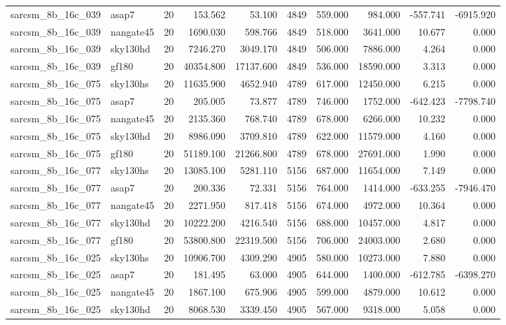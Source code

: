 \begin{tabular}{llrrrrrrrr}
sarcsm\_8b\_16c\_039 & asap7 & 20 & 153.562 & 53.100 & 4849 & 559.000 & 984.000 & -557.741 & -6915.920 \\
sarcsm\_8b\_16c\_039 & nangate45 & 20 & 1690.030 & 598.766 & 4849 & 518.000 & 3641.000 & 10.677 & 0.000 \\
sarcsm\_8b\_16c\_039 & sky130hd & 20 & 7246.270 & 3049.170 & 4849 & 506.000 & 7886.000 & 4.264 & 0.000 \\
sarcsm\_8b\_16c\_039 & gf180 & 20 & 40354.800 & 17137.600 & 4849 & 536.000 & 18590.000 & 3.313 & 0.000 \\
sarcsm\_8b\_16c\_075 & sky130hs & 20 & 11635.900 & 4652.940 & 4789 & 617.000 & 12450.000 & 6.215 & 0.000 \\
sarcsm\_8b\_16c\_075 & asap7 & 20 & 205.005 & 73.877 & 4789 & 746.000 & 1752.000 & -642.423 & -7798.740 \\
sarcsm\_8b\_16c\_075 & nangate45 & 20 & 2135.360 & 768.740 & 4789 & 678.000 & 6266.000 & 10.232 & 0.000 \\
sarcsm\_8b\_16c\_075 & sky130hd & 20 & 8986.090 & 3709.810 & 4789 & 622.000 & 11579.000 & 4.160 & 0.000 \\
sarcsm\_8b\_16c\_075 & gf180 & 20 & 51189.100 & 21266.800 & 4789 & 678.000 & 27691.000 & 1.990 & 0.000 \\
sarcsm\_8b\_16c\_077 & sky130hs & 20 & 13085.100 & 5281.110 & 5156 & 687.000 & 11654.000 & 7.149 & 0.000 \\
sarcsm\_8b\_16c\_077 & asap7 & 20 & 200.336 & 72.331 & 5156 & 764.000 & 1414.000 & -633.255 & -7946.470 \\
sarcsm\_8b\_16c\_077 & nangate45 & 20 & 2271.950 & 817.418 & 5156 & 674.000 & 4972.000 & 10.364 & 0.000 \\
sarcsm\_8b\_16c\_077 & sky130hd & 20 & 10222.200 & 4216.540 & 5156 & 688.000 & 10457.000 & 4.817 & 0.000 \\
sarcsm\_8b\_16c\_077 & gf180 & 20 & 53800.800 & 22319.500 & 5156 & 706.000 & 24003.000 & 2.680 & 0.000 \\
sarcsm\_8b\_16c\_025 & sky130hs & 20 & 10906.700 & 4309.290 & 4905 & 580.000 & 10273.000 & 7.880 & 0.000 \\
sarcsm\_8b\_16c\_025 & asap7 & 20 & 181.495 & 63.000 & 4905 & 644.000 & 1400.000 & -612.785 & -6398.270 \\
sarcsm\_8b\_16c\_025 & nangate45 & 20 & 1867.100 & 675.906 & 4905 & 599.000 & 4879.000 & 10.612 & 0.000 \\
sarcsm\_8b\_16c\_025 & sky130hd & 20 & 8068.530 & 3339.450 & 4905 & 567.000 & 9318.000 & 5.058 & 0.000 \\

\end{tabular}
